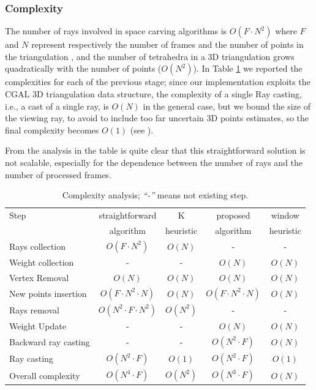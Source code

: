 \subsubsection{Complexity}
The number of rays involved in space carving algorithms is $O(F\cdot N^2)$ where $F$ and $N$ represent respectively the number of frames and the number of points in the triangulation \cite{Lovi_et_al_11}, and the number of tetrahedra in a 3D triangulation grows quadratically with the number of points ($O(N^2)$). 
In Table \ref{tab:ComStraight} we reported the complexities for each of the previous stage; since our implementation exploits the CGAL \cite{cgal} 3D triangulation data structure, the complexity of a single Ray casting, i.e., a cast of a single ray, is $O(N)$ in the general case, but we bound the size of the viewing ray, to avoid to include too far uncertain 3D points estimates, so the final complexity becomes $O(1)$  (see \cite[p.94]{yu2013automatic}).

From the analysis in the table is quite clear that this straightforward solution is not scalable, especially for the dependence between the number of rays and the number of processed frames. 

\begin{table}[t]
\caption{Complexity analysis; \emph{``-''} means not existing step.}
\label{tab:ComStraight}
\scriptsize
\centering
\begin{tabular}{lcccc}
\toprule 
Step                & straightforward     & K  & proposed     & window \\
                    & algorithm & heuristic & algorithm & heuristic \\
\midrule
Rays collection     &  $O(F\cdot N^2)$ & $O(N)$ &-&-\\
Weight collection    &-&- &  $O(N)$ & $O(N)$ \\
Vertex Removal      &  $O(N)$           & $O(N)$ &  $O(N)$           & $O(N)$ \\
New points insertion&  $O(F\cdot N^2 \cdot N)$ & $O(N)$ &  $O(F\cdot N^2 \cdot N)$ & $O(N)$ \\
Rays removal     &  $O(N^2\cdot F\cdot N^2)$ & $O(N^2)$ &-&-\\
Weight Update     &-&-&  $O(N)$ & $O(N)$ \\
Backward ray casting &-&-    &  $O(N^2\cdot F)$ & $O(N)$ \\
Ray casting     &  $O(N^2\cdot F)$ & $O(1)$ &  $O(N^2\cdot F)$ & $O(1)$ \\
\midrule
Overall complexity     &  $O(N^4\cdot F)$ & $O(N^2)$ &  $O(N^3\cdot F)$ & $O(N)$ \\
\end{tabular}
\end{table}

